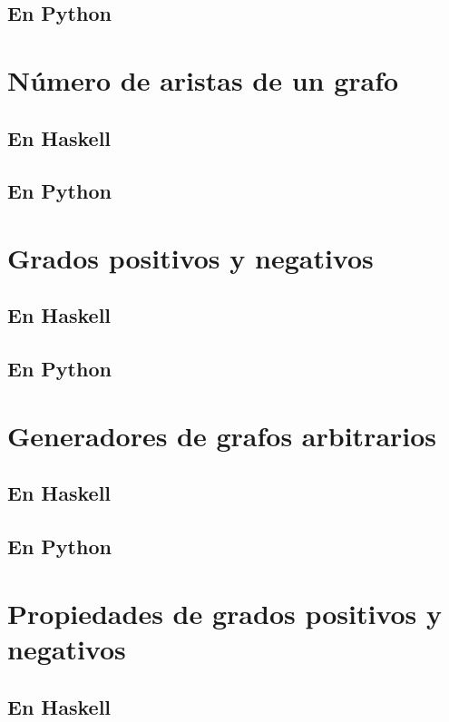 \documentclass[a4paper,12pt,twoside]{book}
\begin{document}
\subsection{En Python}

\section{Número de aristas de un grafo}
\subsection{En Haskell}
\subsection{En Python}

\section{Grados positivos y negativos}
\subsection{En Haskell}
\subsection{En Python}

\section{Generadores de grafos arbitrarios}
\subsection{En Haskell}
\subsection{En Python}

\section{Propiedades de grados positivos y negativos}
\subsection{En Haskell}
\end{document}
